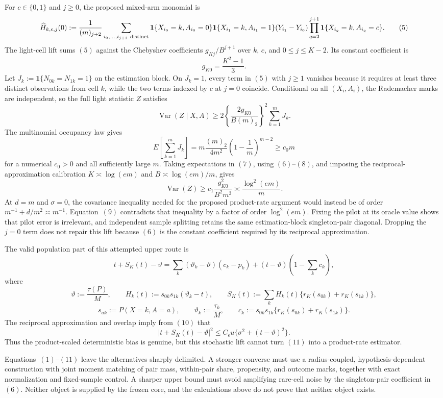 For \(c\in\{0,1\}\) and \(j\ge0\), the proposed mixed-arm monomial is
\[
 \widehat H_{k,c,j}(0)
 :=\frac1{(m)_{j+2}}
 \sum_{i_0,\ldots,i_{j+1}\ {\rm distinct}}
 \mathbf1\{X_{i_0}=k,A_{i_0}=0\}
 \mathbf1\{X_{i_1}=k,A_{i_1}=1\}
 (Y_{i_1}-Y_{i_0})
 \prod_{q=2}^{j+1}\mathbf1\{X_{i_q}=k,A_{i_q}=c\}.
\tag{5}
\]
The light-cell lift sums \((5)\) against the Chebyshev coefficients \(g_{Kj}/B^{j+1}\) over \(k\), \(c\), and \(0\le j\le K-2\).  Its constant coefficient is
\[
 g_{K0}=\frac{K^2-1}{3}.
\tag{6}
\]
Let \(J_k:=\mathbf1\{N_{0k}=N_{1k}=1\}\) on the estimation block.  On \(J_k=1\), every term in \((5)\) with \(j\ge1\) vanishes because it requires at least three distinct observations from cell \(k\), while the two terms indexed by \(c\) at \(j=0\) coincide.  Conditional on all \((X_i,A_i)\), the Rademacher marks are independent, so the full light statistic \(Z\) satisfies
\[
 \operatorname{Var}(Z\mid X,A)
 \ge
 2\left\{\frac{2g_{K0}}{B(m)_2}\right\}^{\!2}
 \sum_{k=1}^m J_k.
\tag{7}
\]
The multinomial occupancy law gives
\[
 E\!\left[\sum_{k=1}^mJ_k\right]
 =m\frac{(m)_2}{4m^2}
 \left(1-\frac1m\right)^{m-2}
 \ge c_0m
\tag{8}
\]
for a numerical \(c_0>0\) and all sufficiently large \(m\).  Taking expectations in \((7)\), using \((6)\)--\((8)\), and imposing the reciprocal-approximation calibration \(K\asymp\log(em)\) and \(B\asymp\log(em)/m\), gives
\[
 \operatorname{Var}(Z)
 \ge c_1\frac{g_{K0}^2}{B^2m^3}
 \asymp \frac{\log^2(em)}m.
\tag{9}
\]
At \(d=m\) and \(\sigma=0\), the covariance inequality needed for the proposed product-rate argument would instead be of order \(m^{-1}+d/m^2\asymp m^{-1}\).  Equation~\((9)\) contradicts that inequality by a factor of order \(\log^2(em)\).  Fixing the pilot at its oracle value shows that pilot error is irrelevant, and independent sample splitting retains the same estimation-block singleton-pair diagonal.  Dropping the \(j=0\) term does not repair this lift because \((6)\) is the constant coefficient required by its reciprocal approximation.

The valid population part of this attempted upper route is
\[
 t+S_K(t)-\vartheta
 =\sum_k(\vartheta_k-\vartheta)(c_k-p_k)
 +(t-\vartheta)\left(1-\sum_kc_k\right),
\tag{10}
\]
where
\[
 \vartheta:=\frac{\tau(P)}M,\qquad
 H_k(t):=s_{0k}s_{1k}(\vartheta_k-t),\qquad
 S_K(t):=\sum_kH_k(t)\{r_K(s_{0k})+r_K(s_{1k})\},
\]
\[
 s_{ak}:=P(X=k,A=a),\qquad \vartheta_k:=\frac{\tau_k}{M},\qquad
 c_k:=s_{0k}s_{1k}\{r_K(s_{0k})+r_K(s_{1k})\}.
\]
The reciprocal approximation and overlap imply from \((10)\) that
\[
 |t+S_K(t)-\vartheta|^2
 \le C_{\epsilon}u\{\sigma^2+(t-\vartheta)^2\}.
\tag{11}
\]
Thus the product-scaled deterministic bias is genuine, but this stochastic lift cannot turn \((11)\) into a product-rate estimator.

Equations~\((1)\)--\((11)\) leave the alternatives sharply delimited.  A stronger converse must use a radius-coupled, hypothesis-dependent construction with joint moment matching of pair mass, within-pair share, propensity, and outcome marks, together with exact normalization and fixed-sample control.  A sharper upper bound must avoid amplifying rare-cell noise by the singleton-pair coefficient in \((6)\).  Neither object is supplied by the frozen core, and the calculations above do not prove that neither object exists.